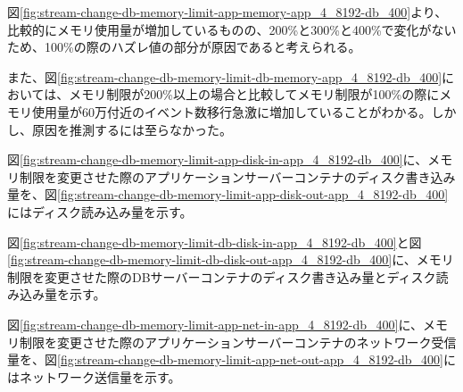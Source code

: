 \documentclass[../../../../main]{subfiles}
\begin{document}
    

    

    図\ref{fig:stream-change-db-memory-limit-app-memory-app_4_8192-db_400}より、比較的にメモリ使用量が増加しているものの、200\%と300\%と400\%で変化がないため、100\%の際のハズレ値の部分が原因であると考えられる。

    また、図\ref{fig:stream-change-db-memory-limit-db-memory-app_4_8192-db_400}においては、メモリ制限が200\%以上の場合と比較してメモリ制限が100\%の際にメモリ使用量が60万付近のイベント数移行急激に増加していることがわかる。しかし、原因を推測するには至らなかった。


    図\ref{fig:stream-change-db-memory-limit-app-disk-in-app_4_8192-db_400}に、メモリ制限を変更させた際のアプリケーションサーバーコンテナのディスク書き込み量を、図\ref{fig:stream-change-db-memory-limit-app-disk-out-app_4_8192-db_400}にはディスク読み込み量を示す。

    
    

    図\ref{fig:stream-change-db-memory-limit-db-disk-in-app_4_8192-db_400}と図\ref{fig:stream-change-db-memory-limit-db-disk-out-app_4_8192-db_400}に、メモリ制限を変更させた際のDBサーバーコンテナのディスク書き込み量とディスク読み込み量を示す。

    
    


    図\ref{fig:stream-change-db-memory-limit-app-net-in-app_4_8192-db_400}に、メモリ制限を変更させた際のアプリケーションサーバーコンテナのネットワーク受信量を、図\ref{fig:stream-change-db-memory-limit-app-net-out-app_4_8192-db_400}にはネットワーク送信量を示す。

    
    
\end{document}
